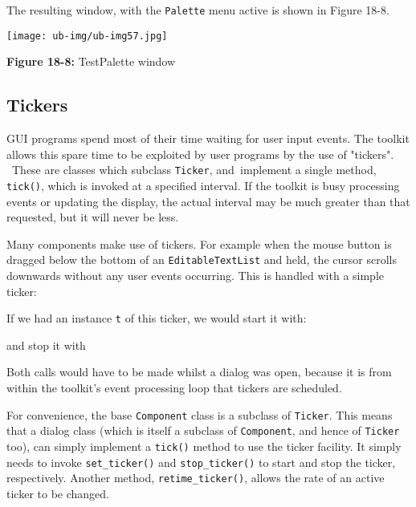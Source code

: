 \bigskip

The resulting window, with the \texttt{Palette} menu active is shown in
Figure 18-8.

\begin{center}
\texttt{[image: ub-img/ub-img57.jpg]}
\end{center}

{\sffamily\bfseries Figure 18-8:}
{\sffamily TestPalette window}

\subsection{Tickers}

GUI programs spend most of their time waiting for user input
events. The toolkit allows this spare time to be exploited by user
programs by the use of "tickers". \ These
are classes which subclass \texttt{Ticker}, and\texttt{ }implement a
single method, \texttt{tick()}, which is invoked at a specified
interval. If the toolkit is busy processing events or
updating the display, the actual interval may be much greater than that
requested, but it will never be less.

Many components make use of tickers. For example when the mouse button
is dragged below the bottom of an \texttt{EditableTextList} and held,
the cursor scrolls downwards without any user events occurring. This
is handled with a simple ticker:


\noindent
If we had an instance \texttt{t} of this ticker, we would start it with:


\noindent and stop it with


Both calls would have to be made whilst a dialog was open, because it is
from within the toolkit's event processing loop that
tickers are scheduled.

For convenience, the base \texttt{Component} class is a subclass of
\texttt{Ticker}. This means that a dialog class (which is itself a
subclass of \texttt{Component}, and hence of \texttt{Ticker} too), can
simply implement a \texttt{tick()} method to use the ticker facility.
It simply needs to invoke \texttt{set\_ticker()} and
\texttt{stop\_ticker()} to start and stop the ticker, respectively.
Another method, \texttt{retime\_ticker()}, allows the rate of an
active ticker to be changed.

